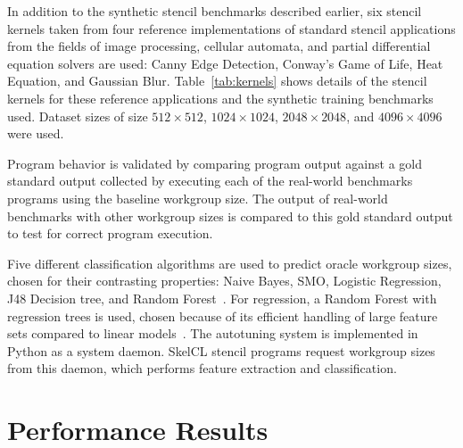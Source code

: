 \documentclass{acaces}
\begin{document}
In addition to the synthetic stencil benchmarks described earlier, six
stencil kernels taken from four reference implementations of standard
stencil applications from the fields of image processing, cellular
automata, and partial differential equation solvers are used: Canny
Edge Detection, Conway's Game of Life, Heat Equation, and Gaussian
Blur. Table~\ref{tab:kernels} shows details of the stencil kernels for
these reference applications and the synthetic training benchmarks
used. Dataset sizes of size $512\times512$, $1024\times1024$,
$2048\times2048$, and $4096\times4096$ were used.

Program behavior is validated by comparing program output against a
gold standard output collected by executing each of the real-world
benchmarks programs using the baseline workgroup size. The output of
real-world benchmarks with other workgroup sizes is compared to this
gold standard output to test for correct program execution.

Five different classification algorithms are used to predict oracle
workgroup sizes, chosen for their contrasting properties: Naive Bayes,
SMO, Logistic Regression, J48 Decision tree, and Random
Forest~\cite{Han2011}. For regression, a Random Forest with regression
trees is used, chosen because of its efficient handling of large
feature sets compared to linear models~\cite{Breiman1999}. The
autotuning system is implemented in Python as a system daemon. SkelCL
stencil programs request workgroup sizes from this daemon, which
performs feature extraction and classification.


\section{Performance Results}\label{sec:results}
\end{document}
